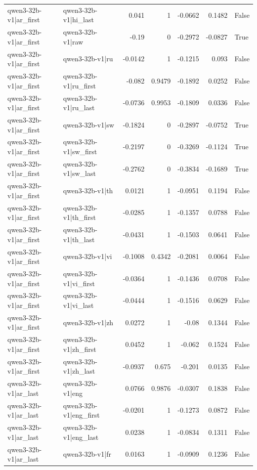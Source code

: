\begin{table}
\begin{tabular}{l l r r r r l}
qwen3-32b-v1|ar_first & qwen3-32b-v1|hi_last & 0.041 & 1 & -0.0662 & 0.1482 & False \\
qwen3-32b-v1|ar_first & qwen3-32b-v1|raw & -0.19 & 0 & -0.2972 & -0.0827 & True \\
qwen3-32b-v1|ar_first & qwen3-32b-v1|ru & -0.0142 & 1 & -0.1215 & 0.093 & False \\
qwen3-32b-v1|ar_first & qwen3-32b-v1|ru_first & -0.082 & 0.9479 & -0.1892 & 0.0252 & False \\
qwen3-32b-v1|ar_first & qwen3-32b-v1|ru_last & -0.0736 & 0.9953 & -0.1809 & 0.0336 & False \\
qwen3-32b-v1|ar_first & qwen3-32b-v1|sw & -0.1824 & 0 & -0.2897 & -0.0752 & True \\
qwen3-32b-v1|ar_first & qwen3-32b-v1|sw_first & -0.2197 & 0 & -0.3269 & -0.1124 & True \\
qwen3-32b-v1|ar_first & qwen3-32b-v1|sw_last & -0.2762 & 0 & -0.3834 & -0.1689 & True \\
qwen3-32b-v1|ar_first & qwen3-32b-v1|th & 0.0121 & 1 & -0.0951 & 0.1194 & False \\
qwen3-32b-v1|ar_first & qwen3-32b-v1|th_first & -0.0285 & 1 & -0.1357 & 0.0788 & False \\
qwen3-32b-v1|ar_first & qwen3-32b-v1|th_last & -0.0431 & 1 & -0.1503 & 0.0641 & False \\
qwen3-32b-v1|ar_first & qwen3-32b-v1|vi & -0.1008 & 0.4342 & -0.2081 & 0.0064 & False \\
qwen3-32b-v1|ar_first & qwen3-32b-v1|vi_first & -0.0364 & 1 & -0.1436 & 0.0708 & False \\
qwen3-32b-v1|ar_first & qwen3-32b-v1|vi_last & -0.0444 & 1 & -0.1516 & 0.0629 & False \\
qwen3-32b-v1|ar_first & qwen3-32b-v1|zh & 0.0272 & 1 & -0.08 & 0.1344 & False \\
qwen3-32b-v1|ar_first & qwen3-32b-v1|zh_first & 0.0452 & 1 & -0.062 & 0.1524 & False \\
qwen3-32b-v1|ar_first & qwen3-32b-v1|zh_last & -0.0937 & 0.675 & -0.201 & 0.0135 & False \\
qwen3-32b-v1|ar_last & qwen3-32b-v1|eng & 0.0766 & 0.9876 & -0.0307 & 0.1838 & False \\
qwen3-32b-v1|ar_last & qwen3-32b-v1|eng_first & -0.0201 & 1 & -0.1273 & 0.0872 & False \\
qwen3-32b-v1|ar_last & qwen3-32b-v1|eng_last & 0.0238 & 1 & -0.0834 & 0.1311 & False \\
qwen3-32b-v1|ar_last & qwen3-32b-v1|fr & 0.0163 & 1 & -0.0909 & 0.1236 & False \\

\end{tabular}
\end{table}
